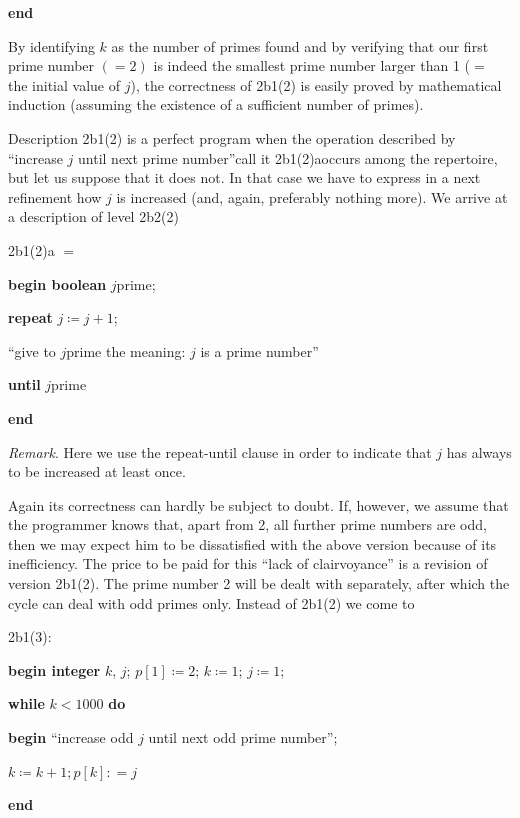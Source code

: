 \documentclass[twoside,11pt]{book}
\begin{document}
\noindent
\textbf{end}

By identifying $k$ as the number of primes found and by verifying that our first prime number $(=2)$ is indeed the smallest prime number larger than 1 ($=$ the initial value of $j$), the correctness of 2b1(2) is easily proved by mathematical induction (assuming the existence of a sufficient number of primes).

Description 2b1(2) is a perfect program when the operation described by ``increase $j$ until next prime number''\textemdash{}call it 2b1(2)a\textemdash{}occurs among the repertoire, but let us suppose that it does not. In that case we have to express in a next refinement how $j$ is increased (and, again, preferably nothing more). We arrive at a description of level 2b2(2)

\noindent
2b1(2)a $=$

\noindent
\textbf{begin boolean} $j$prime;

\noindent
\quad \textbf{repeat} $j \coloneq j + 1$;

\noindent
\quad\quad  ``give to $j$prime the meaning: $j$ is a prime number''

\noindent
\quad \textbf{until} $j$prime

\noindent
\textbf{end}

\noindent
\textit{Remark}. Here we use the repeat-until clause in order to indicate that $j$ has always to be increased at least once.

Again its correctness can hardly be subject to doubt. If, however, we assume that the programmer knows that, apart from 2, all further prime numbers are odd, then we may expect him to be dissatisfied with the above version because of its inefficiency. The price to be paid for this ``lack of clairvoyance'' is a revision of version 2b1(2). The prime number 2 will be dealt with separately, after which the cycle can deal with odd primes only. Instead of 2b1(2) we come to

\noindent
2b1(3):

\noindent
\textbf{begin integer} $k$, $j$; $p[1] \coloneq 2$; $k \coloneq 1$; $j \coloneq 1$;

\noindent
\quad\textbf{while} $k < 1000$ \textbf{do}

\noindent
\quad\quad\textbf{begin} ``increase odd $j$ until next odd prime number'';

\noindent
\quad\quad\quad $k \coloneq k + 1; p[k]: = j$

\noindent
\quad\quad\textbf{end}
\end{document}
